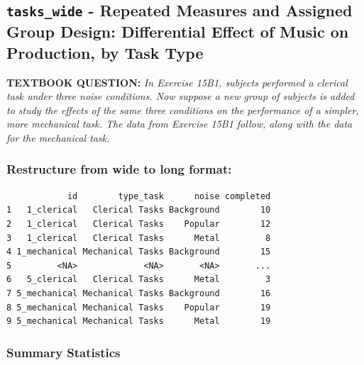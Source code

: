 \documentclass[
]{article}
\begin{document}
\hypertarget{tasks_wide---repeated-measures-and-assigned-group-design-differential-effect-of-music-on-production-by-task-type}{%
\subsection{\texorpdfstring{\texttt{tasks\_wide} - Repeated Measures and
Assigned Group Design: Differential Effect of Music on Production, by
Task
Type}{tasks\_wide - Repeated Measures and Assigned Group Design: Differential Effect of Music on Production, by Task Type}}\label{tasks_wide---repeated-measures-and-assigned-group-design-differential-effect-of-music-on-production-by-task-type}}

\textbf{TEXTBOOK QUESTION:} \emph{In Exercise 15B1, subjects performed a
clerical task under three noise conditions. Now suppose a new group of
subjects is added to study the effects of the same three conditions on
the performance of a simpler, more mechanical task. The data from
Exercise 15B1 follow, along with the data for the mechanical task.}

\hypertarget{restructure-from-wide-to-long-format}{%
\subsubsection{Restructure from wide to long
format:}\label{restructure-from-wide-to-long-format}}

\begin{verbatim}
            id        type_task      noise completed
1   1_clerical   Clerical Tasks Background        10
2   1_clerical   Clerical Tasks    Popular        12
3   1_clerical   Clerical Tasks      Metal         8
4 1_mechanical Mechanical Tasks Background        15
5         <NA>             <NA>       <NA>       ...
6   5_clerical   Clerical Tasks      Metal         3
7 5_mechanical Mechanical Tasks Background        16
8 5_mechanical Mechanical Tasks    Popular        19
9 5_mechanical Mechanical Tasks      Metal        19
\end{verbatim}

\hypertarget{summary-statistics}{%
\subsubsection{Summary Statistics}\label{summary-statistics}}
\end{document}
